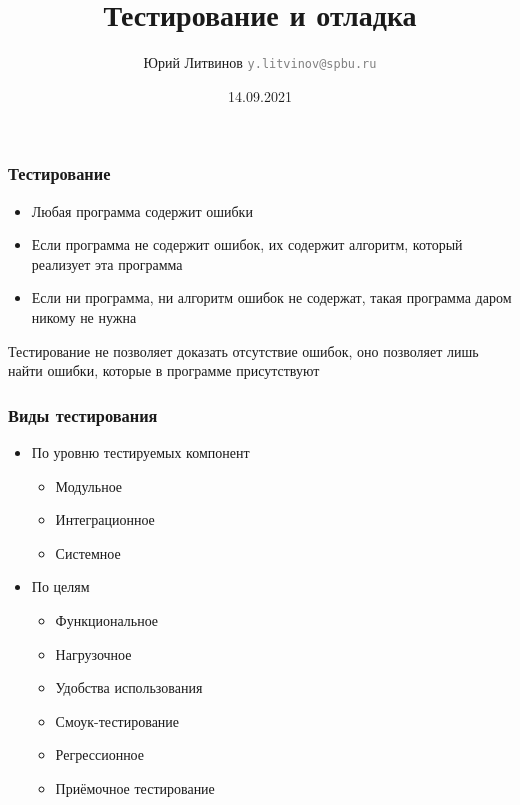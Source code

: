 \documentclass[xetex,mathserif,serif]{beamer}
\title{Тестирование и отладка}
\author[Юрий Литвинов]{Юрий Литвинов \newline \textcolor{gray}{\small\texttt{y.litvinov@spbu.ru}}}
\date{14.09.2021}
\begin{document}
    
    \frame{\titlepage}
    
    \begin{frame}
        \frametitle{Тестирование}
        \begin{itemize}
            \item Любая программа содержит ошибки
            \item Если программа не содержит ошибок, их содержит алгоритм, который реализует эта программа
            \item Если ни программа, ни алгоритм ошибок не содержат, такая программа даром никому не нужна
        \end{itemize}
        \vspace{1cm}
        Тестирование не позволяет доказать отсутствие ошибок, оно позволяет лишь найти ошибки, которые в программе присутствуют
    \end{frame}

    \begin{frame}
        \frametitle{Виды тестирования}
        \begin{itemize}
            \item По уровню тестируемых компонент
            \begin{itemize}
                \item Модульное
                \item Интеграционное
                \item Системное
            \end{itemize}
            \item По целям
            \begin{itemize}
                \item Функциональное
                \item Нагрузочное
                \item Удобства использования
                \item Смоук-тестирование
                \item Регрессионное
                \item Приёмочное тестирование
            \end{itemize}
        \end{itemize}
    \end{frame}
\end{document}

